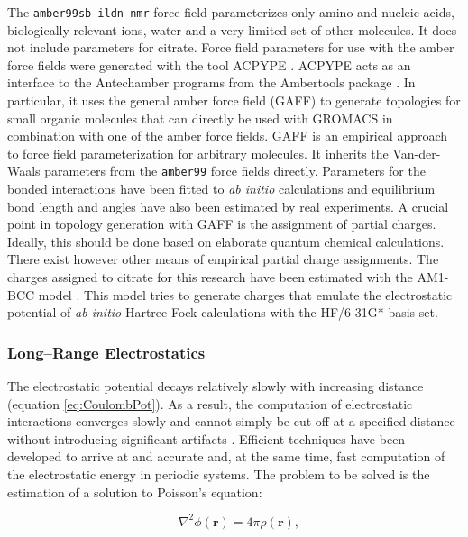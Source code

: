 \documentclass[english, a4paper, 12pt, titlepage, draft]{article}
\newcommand{\vect}[1]{\mathbf{#1}}
\begin{document}
The \texttt{amber99sb-ildn-nmr} force field parameterizes only amino and nucleic acids, biologically relevant ions, water and a very limited set of other molecules.
It does not include parameters for citrate.
Force field parameters for use with the amber force fields were generated with the tool ACPYPE \cite{ACPYPE}.
ACPYPE acts as an interface to the Antechamber programs from the Ambertools package \cite{antechamber}.
In particular, it uses the general amber force field (GAFF) \cite{GAFF} to generate topologies for small organic molecules that can directly be used with GROMACS in combination with one of the amber force fields.
GAFF is an empirical approach to force field parameterization for arbitrary molecules.
It inherits the Van-der-Waals parameters from the \texttt{amber99} force fields directly.
Parameters for the bonded interactions have been fitted to \textit{ab initio} calculations and equilibrium bond length and angles have also been estimated by real experiments.
A crucial point in topology generation with GAFF is the assignment of partial charges.
Ideally, this should be done based on elaborate quantum chemical calculations.
There exist however other means of empirical partial charge assignments.
The charges assigned to citrate for this research have been estimated with the AM1-BCC model \cite{am1bcc_method} \cite{am1bcc_validation}.
This model tries to generate charges that emulate the electrostatic potential of \textit{ab initio} Hartree Fock calculations with the HF/6-31G* basis set.



\subsubsection{Long--Range Electrostatics}
\label{sec:PME}

The electrostatic potential decays relatively slowly with increasing distance (equation \ref{eq:CoulombPot}).
As a result, the computation of electrostatic interactions converges slowly and cannot simply be cut off at a specified distance without introducing significant artifacts \cite{FrenkelSmit}.
Efficient techniques have been developed to arrive at and accurate and, at the same time, fast computation of the electrostatic energy in periodic systems.
The problem to be solved is the estimation of a solution to Poisson's equation:

\begin{equation}
    -\nabla^2 \phi(\vect{r}) = 4 \pi \rho(\vect{r}),
\end{equation}
\end{document}
